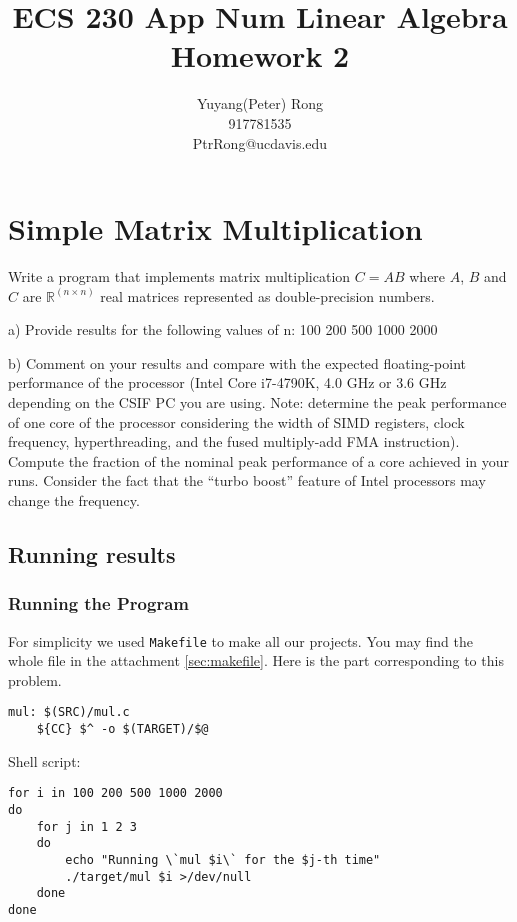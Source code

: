 \documentclass[12pt]{article}
\title{ECS 230 App Num Linear Algebra \\ Homework 2}
\author{Yuyang(Peter) Rong \\917781535 \\ PtrRong@ucdavis.edu}
\begin{document}
\maketitle

\section{Simple Matrix Multiplication}
Write a program that implements matrix multiplication $C=AB$ where $A$, $B$ and $C$ are $\mathbb{R}^{(n \times n)}$ real matrices represented as double-precision numbers.

a) Provide results for the following values of n: 100 200 500 1000 2000

b) Comment on your results and compare with the expected floating-point performance of
the processor (Intel Core i7-4790K, 4.0 GHz or 3.6 GHz depending on the CSIF PC you are
using. Note: determine the peak performance of one core of the processor considering the
width of SIMD registers, clock frequency, hyperthreading, and the fused multiply-add FMA
instruction). Compute the fraction of the nominal peak performance of a core achieved in
your runs. Consider the fact that the “turbo boost” feature of Intel processors may change
the frequency.



\subsection{Running results}

\subsubsection{Running the Program}
For simplicity we used \texttt{Makefile} to make all our projects.
You may find the whole file in the attachment \autoref{sec:makefile}.
Here is the part corresponding to this problem.
\begin{lstlisting}
mul: $(SRC)/mul.c
	${CC} $^ -o $(TARGET)/$@
\end{lstlisting}

Shell script:
\begin{lstlisting}
for i in 100 200 500 1000 2000
do
    for j in 1 2 3
    do
        echo "Running \`mul $i\` for the $j-th time"
        ./target/mul $i >/dev/null
    done
done
\end{lstlisting}
\end{document}
